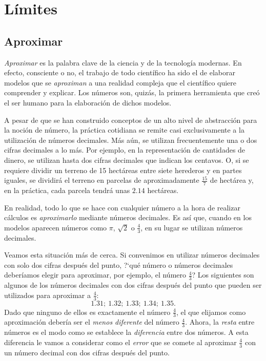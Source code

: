 \chapter[Límites]{Límites}

\section{Aproximar}

\textit{Aproximar} es la palabra clave de la ciencia y de la tecnología modernas. En efecto,
consciente o no, el trabajo de todo científico ha sido el de elaborar modelos que se
\textit{aproximan} a una realidad compleja que el científico quiere comprender y explicar. Los
números son, quizás, la primera herramienta que creó el ser humano para la elaboración de dichos
modelos.

A pesar de que se han construido conceptos de un alto nivel de abstracción para la noción de
número, la práctica cotidiana se remite casi exclusivamente a la utilización de números decimales.
Más aún, se utilizan frecuentemente una o dos cifras decimales a lo más. Por ejemplo, en la
representación de cantidades de dinero, se utilizan hasta dos cifras decimales que indican los
centavos. O, si se requiere dividir un terreno de 15 hectáreas entre siete herederos y en partes
iguales, se dividirá el terreno en parcelas de aproximadamente $\frac{15}{7}$ de hectárea y, en la
práctica, cada parcela tendrá unas $2.14$ hectáreas.

En realidad, todo lo que se hace con cualquier número a la hora de realizar cálculos es
\textit{aproximarlo} mediante números decimales. Es así que, cuando en los modelos aparecen números
como $\pi$, $\sqrt{2}$ o $\frac{4}{3}$, en su lugar se utilizan números decimales.

Veamos esta situación más de cerca. Si convenimos en utilizar números decimales con solo dos cifras
después del punto, ?`qué número o números decimales deberíamos elegir para aproximar, por ejemplo,
el número $\frac{4}{3}$? Los siguientes son algunos de los números decimales con dos cifras después
del punto que pueden ser utilizados para aproximar a $\frac{4}{3}$:
\[
1.31; \ 1.32; \ 1.33; \ 1.34; \ 1.35.
\]
Dado que ninguno de ellos es exactamente el número $\frac{4}{3}$, el que elijamos como aproximación
debería ser el \textit{menos diferente} del número $\frac{4}{3}$. Ahora, la \textit{resta} entre
números es el modo como se establece la \textit{diferencia} entre dos números. A esta diferencia le
vamos a considerar como el \textit{error} que se comete al aproximar $\frac{4}{3}$ con un número
decimal con dos cifras después del punto.

